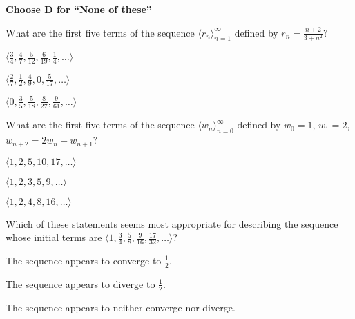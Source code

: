 \documentclass[12pt]{exam}
\newcommand{\<}{\langle}
\renewcommand{\>}{\rangle}
\begin{document}
\begin{center}
\end{center}
\vspace{0.1in}

\vspace{12pt}

\textbf{Choose D for ``None of these''}

\begin{questions}\setcounter{question}{25}

\question
What are the first five terms of the sequence \(\<r_n\>_{n=1}^\infty\)
defined by \(r_n=\frac{n+2}{3+n^2}\)?
\begin{choices}
\item
  \(\<\frac{3}{4},\frac{4}{7},\frac{5}{12},\frac{6}{19},\frac{1}{4},\dots\>\)
\item
  \(\<\frac{2}{7},\frac{1}{2},\frac{4}{9},0,\frac{5}{17},\dots\>\)
\item
  \(\<0,\frac{3}{5},\frac{5}{18},\frac{8}{27},\frac{9}{61},\dots\>\)
\end{choices}

\question
What are the first five terms of the sequence \(\<w_n\>_{n=0}^\infty\)
defined by \(w_0=1\), \(w_1=2\), \(w_{n+2}=2w_n+w_{n+1}\)?
\begin{choices}
\item
  \(\<1,2,5,10,17,\dots\>\)
\item
  \(\<1,2,3,5,9,\dots\>\)
\item
  \(\<1,2,4,8,16,\dots\>\)
\end{choices}

\question
Which of these statements seems most appropriate for describing the
sequence whose initial terms are
\(\<1,\frac{3}{4},\frac{5}{8},\frac{9}{16},\frac{17}{32},\dots\>\)?
\begin{choices}
\item The sequence appears to converge to \(\frac{1}{2}\).
\item The sequence appears to diverge to \(\frac{1}{2}\).
\item The sequence appears to neither converge nor diverge.
\end{choices}





\end{questions}
\end{document}
